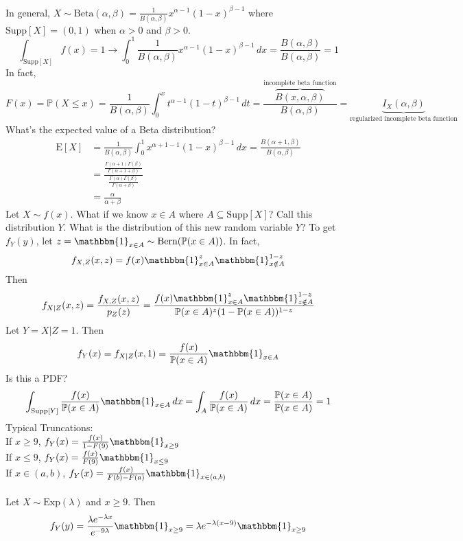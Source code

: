 \documentclass[12pt]{article}
\newcommand{\prob}[1]{\mathbb{P}(#1)}
\newcommand{\indicator}[1]{\mathbbm{1}_{#1}}
\newcommand{\supp}[1]{\text{Supp}[ #1 ]}
\newcommand{\expected}[1]{\mathrm{E}[#1]}
\begin{document}
In general,  $X\sim \text{Beta}(\alpha, \beta) = \frac{1}{B(\alpha, \beta)}x^{\alpha - 1}(1 - x)^{\beta - 1}$ where $\supp{X} = (0, 1)$ when $\alpha > 0$ and $\beta > 0$. 
$$\int_{\supp{X}} f(x) = 1 \to \int_0^1 \frac{1}{B(\alpha, \beta)} x^{\alpha - 1}(1 - x)^{\beta - 1} \, dx = \frac{B(\alpha, \beta)}{B(\alpha, \beta)} = 1 $$ 
In fact, $$F(x) = \prob{X \leq x} = \frac{1}{B(\alpha, \beta)} \int_0^x t^{\alpha - 1}(1 - t)^{\beta - 1} \, dt = \frac{\overbrace{B(x, \alpha, \beta)}^{\text{incomplete beta function}}}{B(\alpha, \beta)} = \underbrace{I_X(\alpha, \beta)}_{\text{regularized incomplete beta function}} $$  
What's the expected value of a Beta distribution? $$ \begin{aligned} 
\expected{X} &= \frac{1}{B(\alpha, \beta)} \int_0^1 x^{\alpha + 1 - 1}(1 - x)^{\beta - 1}\, dx = \frac{B(\alpha + 1, \beta)}{B(\alpha, \beta)} \\ &= \frac{\frac{\Gamma(\alpha + 1)\Gamma(\beta)}{\Gamma(\alpha + 1 + \beta)}}{\frac{\Gamma(\alpha)\Gamma(\beta)}{\Gamma(\alpha+\beta)}} \\ &= \frac{\alpha}{\alpha + \beta} \end{aligned} $$ 
Let $X \sim f(x)$. What if we know $x \in A$ where $ A \subseteq \supp{X}$? Call this distribution $Y$. What is the distribution of this new random variable $Y$? To get $f_Y(y)$, let $z = \indicator{x \in A} \sim \text{Bern}(\prob{x \in A})$. In fact, 
$$ f_{X, Z}(x,z) = f(x)\indicator{x \in A}^z \indicator{x \notin A}^{1 - z} $$ 
Then $$f_{X | Z} (x, z) = \frac{f_{X,Z}(x,z)}{p_Z(z)} = \frac{f(x)\indicator{x \in A}^z \indicator{z \notin A}^{1 - z}}{\prob{x \in A}^z(1 - \prob{x \in A})^{1 - z}} $$ 
Let $Y = X|Z = 1$. Then $$f_Y(x) = f_{X|Z}(x, 1) = \frac{f(x)}{\prob{x \in A}}\indicator{x \in A}$$ 
Is this a PDF? $$\int_{\supp{Y}} \frac{f(x)}{\prob{x \in A}} \indicator{x \in A} \, dx = \int_A \frac{f(x)}{\prob{x \in A}} \, dx = \frac{\prob{x \in A}}{\prob{x \in A}} = 1 $$ 
Typical Truncations: \\
If $x \geq 9$, $f_Y(x) = \frac{f(x)}{1 - F(9)}\indicator{x \geq 9}$ \\ 
If $x \leq 9$, $f_Y(x) = \frac{f(x)}{F(9)}\indicator{x \leq 9} $ \\
If $x \in (a, b)$, $f_Y(x) = \frac{f(x)}{F(b) - F(a)} \indicator{x \in (a, b)} $ \\~\\
Let $X \sim \text{Exp}(\lambda)$ and $ x \geq 9$. Then 
$$f_Y(y) = \frac{\lambda e^{-\lambda x}}{e^{-9\lambda}}\indicator{x \geq 9} = \lambda e^{-\lambda(x - 9)}\indicator{x \geq 9} $$ 
\end{document}
